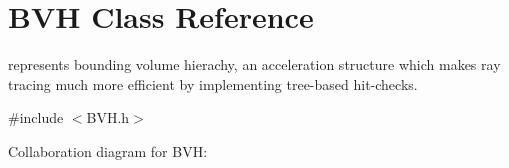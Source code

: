 \hypertarget{classBVH}{}\section{B\+VH Class Reference}
\label{classBVH}


represents bounding volume hierachy, an acceleration structure which makes ray tracing much more efficient by implementing tree-\/based hit-\/checks.  




{\ttfamily \#include $<$B\+V\+H.\+h$>$}



Collaboration diagram for B\+VH\+:
